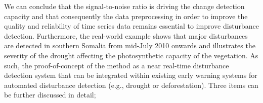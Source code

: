 \documentclass[authoryear,preprint,review,10pt]{elsarticle}
\begin{document}
We can conclude that the signal-to-noise ratio is driving the change detection capacity and that consequently the data preprocessing in order to improve the quality and reliability of time series data remains essential to improve disturbance detection. Furthermore, the real-world example shows that major disturbances are detected in southern Somalia from mid-July 2010 onwards and illustrates the severity of the drought affecting the photosynthetic capacity of the vegetation. As such, the proof-of-concept of the method as a near real-time disturbance detection system that can be integrated within existing early warning systems for automated disturbance detection (e.g., drought or deforestation). Three items can be further discussed in detail;

\end{document}
